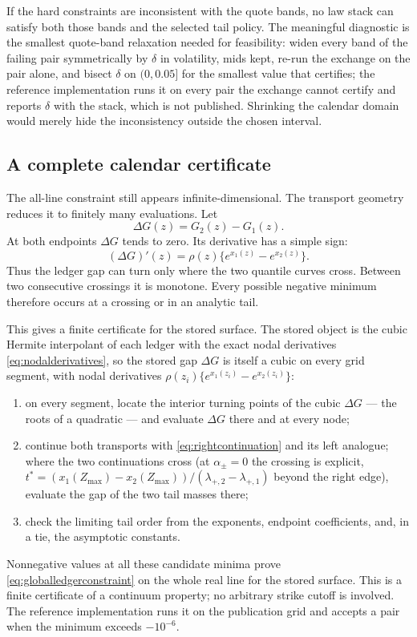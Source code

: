 If the hard constraints are inconsistent with the quote bands, no law stack
can satisfy both those bands and the selected tail policy.  The meaningful
diagnostic is the smallest quote-band relaxation needed for feasibility:
widen every band of the failing pair symmetrically by $\delta$ in
volatility, mids kept, re-run the exchange on the pair alone, and
bisect $\delta$ on $(0,0.05]$ for the smallest value that certifies; the
reference implementation runs it on every pair the exchange cannot
certify and reports $\delta$ with the stack, which is not published.
Shrinking the calendar domain would merely hide the inconsistency outside the
chosen interval.

\subsection{A complete calendar certificate}
\label{sec:calendarcertificate}

The all-line constraint still appears infinite-dimensional.  The transport
geometry reduces it to finitely many evaluations.  Let
\[
\Delta G(z)=G_2(z)-G_1(z).
\]
At both endpoints $\Delta G$ tends to zero.  Its derivative has a simple sign:
\begin{equation}
(\Delta G)'(z)=\rho(z)\{e^{x_1(z)}-e^{x_2(z)}\}.
\label{eq:calgapderivative}
\end{equation}
Thus the ledger gap can turn only where the two quantile curves cross.  Between
two consecutive crossings it is monotone.  Every possible negative minimum
therefore occurs at a crossing or in an analytic tail.

This gives a finite certificate for the stored surface.  The stored
object is the cubic Hermite interpolant of each ledger with the exact
nodal derivatives \eqref{eq:nodalderivatives}, so the stored gap
$\Delta G$ is itself a cubic on every grid segment, with nodal
derivatives $\rho(z_i)\{e^{x_1(z_i)}-e^{x_2(z_i)}\}$:
\begin{enumerate}
\item on every segment, locate the interior turning points of the
cubic $\Delta G$ --- the roots of a quadratic --- and evaluate
$\Delta G$ there and at every node;
\item continue both transports with \eqref{eq:rightcontinuation} and its left
analogue; where the two continuations cross (at $\alpha_\pm=0$ the
crossing is explicit, $t^*=(x_1(Z_{\max})-x_2(Z_{\max}))/
(\lambda_{+,2}-\lambda_{+,1})$ beyond the right edge), evaluate the gap
of the two tail masses there;
\item check the limiting tail order from the exponents, endpoint coefficients,
and, in a tie, the asymptotic constants.
\end{enumerate}
Nonnegative values at all these candidate minima prove
\eqref{eq:globalledgerconstraint} on the whole real line for the
stored surface.  This is a finite
certificate of a continuum property; no arbitrary strike cutoff is involved.
The reference implementation runs it on the publication grid and
accepts a pair when the minimum exceeds $-10^{-6}$.

